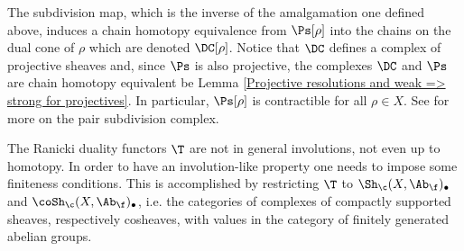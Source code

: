 \documentclass[main.tex]{subfiles}
\begin{document}
\begin{remark}
The subdivision map, which is the inverse of the amalgamation one defined above, induces a chain homotopy equivalence from $\Ps[\rho]$ into the chains on the dual cone of $\rho$ which are denoted $\DC[\rho]$. Notice that $\DC$ defines a complex of projective sheaves and, since $\Ps$ is also projective, the complexes $\DC$ and $\Ps$ are chain homotopy equivalent be Lemma \ref{Projective resolutions and weak => strong for projectives}. In particular, $\Ps[\rho]$ is contractible for all $\rho\in X$. See \cite{Rou10} for more on the pair subdivision complex.
\end{remark}

The Ranicki duality functors $\T$ are not in general involutions, not even up to homotopy. In order to have an involution-like property one needs to impose some finiteness conditions. This is accomplished by restricting $\T$ to $\Sh_{\c}(X,\Ab_{\f})_\bullet$ and $\coSh_{\c}(X,\Ab_{\f})_\bullet$, i.e. the categories of complexes of compactly supported sheaves, respectively cosheaves, with values in the category of finitely generated abelian groups.
\end{document}
